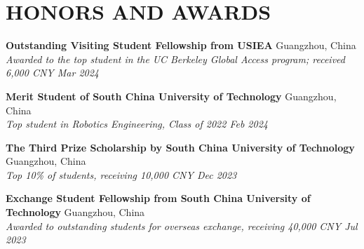 \documentclass[a4paper,9pt]{extarticle}
\begin{document}

\section*{{\textbf{\fontsize{14pt}{8pt}\selectfont H}\textbf{\scshape ONORS AND AWARDS}}}
\textbf{Outstanding Visiting Student Fellowship from USIEA}  \hfill Guangzhou, China \\
\textit{Awarded to the top student in the UC Berkeley Global Access program; received 6,000 CNY \hfill Mar 2024}
\par\vspace{6pt}\noindent
\textbf{Merit Student of South China University of Technology}  \hfill Guangzhou, China \\
\textit{Top student in Robotics Engineering, Class of 2022 \hfill Feb 2024 }
\par\vspace{6pt}\noindent
\textbf{The Third Prize Scholarship by South China University of Technology}  \hfill Guangzhou, China\\ 
\textit{Top 10\% of students, receiving 10,000 CNY \hfill Dec 2023}
\par\vspace{6pt}\noindent
\textbf{Exchange Student Fellowship from South China University of Technology}  \hfill Guangzhou, China\\ 
\textit{Awarded to outstanding students for overseas exchange, receiving 40,000 CNY  \hfill Jul 2023} 
\end{document}
